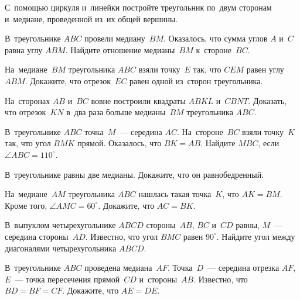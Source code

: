 


\begin{problems}


\item
С~помощью циркуля и~линейки постройте треугольник по~двум сторонам и~медиане,
проведенной из~их общей вершины.


\item
В~треугольнике $ABC$ провели медиану~$BM$.
Оказалось, что сумма углов $A$ и~$C$ равна углу $ABM$.
Найдите отношение медианы~$BM$ к~стороне~$BC$.

\item
На~медиане~$BM$ треугольника $ABC$ взяли точку~$E$ так, что $CEM$ равен
углу $ABM$.
Докажите, что отрезок~$EC$ равен одной из~сторон треугольника.

\item
На~сторонах $AB$ и~$BC$ вовне построили квадраты $ABKL$ и~$CBNT$.
Доказать, что отрезок~$KN$ в~два раза больше медианы~$BM$ треугольника $ABC$.

\item
В~треугольнике $ABC$ точка~$M$~--- середина $AC$.
На~стороне~$BC$ взяли точку~$K$ так, что угол $BMK$ прямой.
Оказалось, что $BK = AB$.
Найдите $MBC$, если $\angle ABC =110^{\circ}$.

\item
В~треугольнике равны две медианы.
Докажите, что он равнобедренный.

\item
На~медиане~$AM$ треугольника $ABC$ нашлась такая точка~$K$, что $AK = BM$.
Кроме того, $\angle AMC = 60^{\circ}$.
Докажите, что $AC = BK$.

\item
В~выпуклом четырехугольнике $ABCD$ стороны~$AB$, $BC$ и~$CD$ равны,
$M$~--- середина стороны~$AD$.
Известно, что угол $BMC$ равен $90^{\circ}$.
Найдите угол между диагоналями четырехугольника $ABCD$.

\item
В~треугольнике $ABC$ проведена медиана~$AF$.
Точка~$D$~--- середина отрезка $AF$, $E$~--- точка пересечения прямой~$CD$
и~стороны~$AB$.
Известно, что $BD = BF = CF$.
Докажите, что $AE = DE$.

\end{problems}

